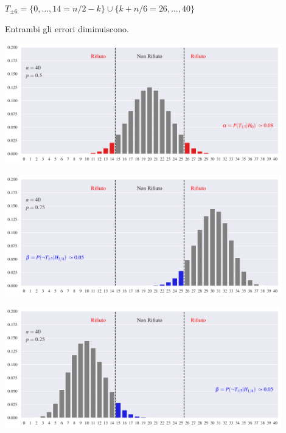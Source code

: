 \documentclass[11pt,openany]{book}
\begin{document}
\hfil$T_{\pm6}=\{0,\dots,14=n/2-k\}\cup \{k+n/6=26,\dots,40\}$

Entrambi gli errori diminuiscono.


\hfil\includegraphics[width=0.9\textwidth]{figure/B-test_07.pdf}

\hfil\includegraphics[width=0.9\textwidth]{figure/B-test_08.pdf}

\hfil\includegraphics[width=0.9\textwidth]{figure/B-test_09.pdf}
\end{document}
